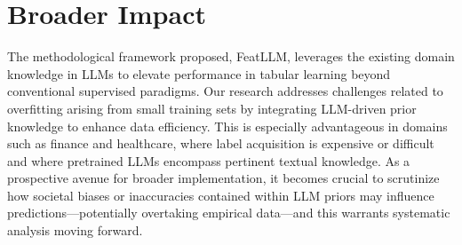 \section{Broader Impact}
The methodological framework proposed, \textsf{FeatLLM}, leverages the existing domain knowledge in LLMs to elevate performance in tabular learning beyond conventional supervised paradigms. Our research addresses challenges related to overfitting arising from small training sets by integrating LLM-driven prior knowledge to enhance data efficiency. This is especially advantageous in domains such as finance and healthcare, where label acquisition is expensive or difficult and where pretrained LLMs encompass pertinent textual knowledge. As a prospective avenue for broader implementation, it becomes crucial to scrutinize how societal biases or inaccuracies contained within LLM priors may influence predictions—potentially overtaking empirical data—and this warrants systematic analysis moving forward.

